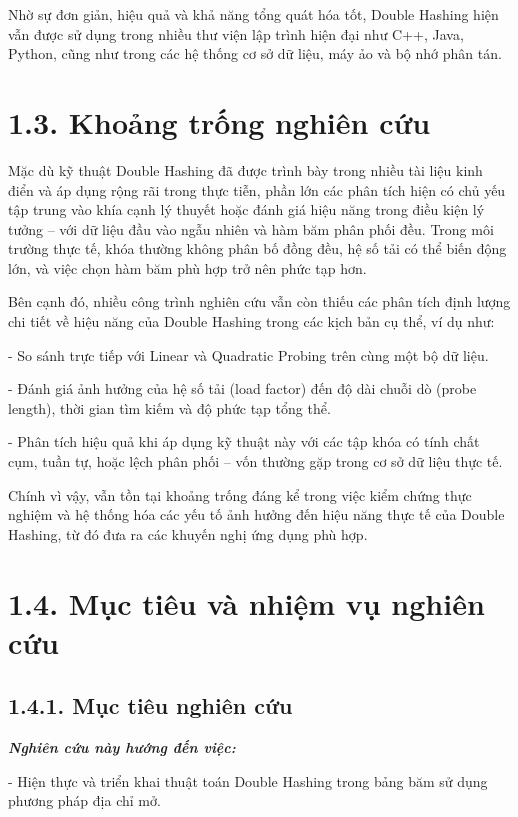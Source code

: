 \documentclass[12pt,a4paper]{report}
\begin{document}
Nhờ sự đơn giản, hiệu quả và khả năng tổng quát hóa tốt, Double Hashing hiện vẫn được sử dụng trong nhiều thư viện lập trình hiện đại như C++, Java, Python, cũng như trong các hệ thống cơ sở dữ liệu, máy ảo và bộ nhớ phân tán.

\section*{1.3. Khoảng trống nghiên cứu}
\noindent \indent Mặc dù kỹ thuật Double Hashing đã được trình bày trong nhiều tài liệu kinh điển và áp dụng rộng rãi trong thực tiễn, phần lớn các phân tích hiện có chủ yếu tập trung vào khía cạnh lý thuyết hoặc đánh giá hiệu năng trong điều kiện lý tưởng – với dữ liệu đầu vào ngẫu nhiên và hàm băm phân phối đều. Trong môi trường thực tế, khóa thường không phân bố đồng đều, hệ số tải có thể biến động lớn, và việc chọn hàm băm phù hợp trở nên phức tạp hơn.

Bên cạnh đó, nhiều công trình nghiên cứu vẫn còn thiếu các phân tích định lượng chi tiết về hiệu năng của Double Hashing trong các kịch bản cụ thể, ví dụ như:

- So sánh trực tiếp với Linear và Quadratic Probing trên cùng một bộ dữ liệu.

- Đánh giá ảnh hưởng của hệ số tải (load factor) đến độ dài chuỗi dò (probe length), thời gian tìm kiếm và độ phức tạp tổng thể.

- Phân tích hiệu quả khi áp dụng kỹ thuật này với các tập khóa có tính chất cụm, tuần tự, hoặc lệch phân phối – vốn thường gặp trong cơ sở dữ liệu thực tế.

Chính vì vậy, vẫn tồn tại khoảng trống đáng kể trong việc kiểm chứng thực nghiệm và hệ thống hóa các yếu tố ảnh hưởng đến hiệu năng thực tế của Double Hashing, từ đó đưa ra các khuyến nghị ứng dụng phù hợp.

\section*{1.4. Mục tiêu và nhiệm vụ nghiên cứu}
\subsection*{1.4.1. Mục tiêu nghiên cứu}
\noindent \indent \textbf{\textit{Nghiên cứu này hướng đến việc:}}

- Hiện thực và triển khai thuật toán Double Hashing trong bảng băm sử dụng phương pháp địa chỉ mở.
\end{document}
